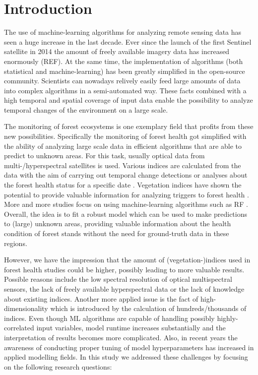 \documentclass[review]{elsarticle}
\begin{document}
\section{Introduction}
\label{sec:intro}

The use of machine-learning algorithms for analyzing remote sensing data has seen a huge increase in the last decade.
Ever since the launch of the first Sentinel satellite in 2014 the amount of freely available imagery data has increased enormously (REF).
At the same time, the implementation of algorithms (both statistical and machine-learning) has been greatly simplified in the open-source community.
Scientists can nowadays relively easily feed large amounts of data into complex algorithms in a semi-automated way.
These facts combined with a high temporal and spatial coverage of input data enable the possibility to analyze temporal changes of the environment on a large scale.

The monitoring of forest ecosystems is one exemplary field that profits from these new possibilities.
Specifically the monitoring of forest health got simplified with the ability of analyzing large scale data in efficient algorithms that are able to predict to unknown areas.
For this task, usually optical data from multi-/hyperspectral satellites is used.
Various indices are calculated from the data with the aim of carrying out temporal change detections \citep{zhang2016} or analyses about the forest health status for a specific date \citep{townsend2012}.
Vegetation indices have shown the potential to provide valuable information for analyzing triggers to forest health \citep{jiang2014, adamczyk2015}.
More and more studies focus on using machine-learning algorithms such as \ac{RF} \citep{belgiu2016, lary2016, michez2016}.
Overall, the idea is to fit a robust model which can be used to make predictions to (large) unknown areas, providing valuable information about the health condition of forest stands without the need for ground-truth data in these regions.

However, we have the impression that the amount of (vegetation-)indices used in forest health studies could be higher, possibly leading to more valuable results.
Possible reasons include the low spectral resolution of optical multispectral sensors, the lack of freely available hyperspectral data or the lack of knowledge about existing indices.
Another more applied issue is the fact of high-dimensionality which is introduced by the calculation of hundreds/thousands of indices.
Even though ML algorithms are capable of handling possibly highly-correlated input variables, model runtime increases substantially and the interpretation of results becomes more complicated.
Also, in recent years the awareness of conducting proper tuning of model hyperparameters has increased in applied modelling fields.
In this study we addressed these challenges by focusing on the following research questions:
\end{document}
